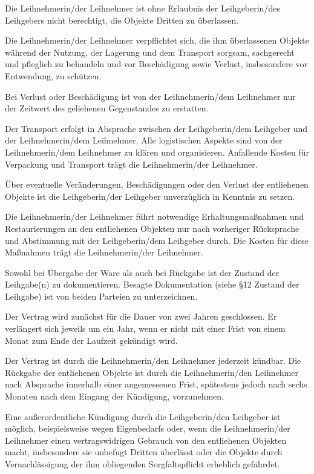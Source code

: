 \documentclass[article, 11pt,a4paper, titlepage, parskip=half, bibliography=totocnumbered]{scrreprt}
\begin{document}
\begin{contract}
		\newpage
			
		
		Die Leihnehmerin/der Leihnehmer ist ohne Erlaubnis der Leihgeberin/des Leihgebers nicht berechtigt, die Objekte Dritten zu überlassen.
		
		Die Leihnehmerin/der Leihnehmer verpflichtet sich, die ihm überlassenen Objekte während der Nutzung, der Lagerung und dem Transport sorgsam, sachgerecht und pfleglich zu behandeln und vor Beschädigung sowie Verlust, insbesondere vor Entwendung, zu schützen.
		
		Bei Verlust oder Beschädigung ist von der Leihnehmerin/dem Leihnehmer nur der Zeitwert des geliehenen Gegenstandes zu erstatten.
		
		Der Transport erfolgt in Absprache zwischen der Leihgeberin/dem Leihgeber und der Leihnehmerin/dem Leihnehmer. Alle logistischen Aspekte sind von der Leihnehmerin/dem Leihnehmer zu klären und organisieren. Anfallende Kosten für Verpackung und Transport trägt die Leihnehmerin/der Leihnehmer.
		
		Über eventuelle Veränderungen, Beschädigungen oder den Verlust der entliehenen Objekte ist die Leihgeberin/der Leihgeber unverzüglich in Kenntnis zu setzen.
		
		Die Leihnehmerin/der Leihnehmer führt notwendige Erhaltungsmaßnahmen und Restaurierungen an den entliehenen Objekten nur nach vorheriger Rücksprache und Abstimmung mit der Leihgeberin/dem Leihgeber durch. Die Kosten für diese Maßnahmen trägt die Leihnehmerin/der Leihnehmer.
		
		Sowohl bei Übergabe der Ware als auch bei Rückgabe ist der Zustand der Leihgabe(n) zu dokumentieren. Besagte Dokumentation (siehe §12 Zustand der Leihgabe) ist von beiden Parteien zu unterzeichnen.
		
		
		
		Der Vertrag wird zunächst für die Dauer von zwei Jahren geschlossen. Er verlängert sich jeweils um ein Jahr, wenn er nicht mit einer Frist von einem Monat zum Ende der Laufzeit gekündigt wird.
		
		Der Vertrag ist durch die Leihnehmerin/den Leihnehmer jederzeit kündbar. Die Rückgabe der entliehenen Objekte ist durch die Leihnehmerin/den Leihnehmer nach Absprache innerhalb einer angemessenen Frist, spätestens jedoch nach sechs Monaten nach dem Eingang der Kündigung, vorzunehmen.
		
		Eine außerordentliche Kündigung durch die Leihgeberin/den Leihgeber ist möglich, beispielsweise wegen Eigenbedarfs oder, wenn die Leihnehmerin/der Leihnehmer einen vertragswidrigen Gebrauch von den entliehenen Objekten macht, insbesondere sie unbefugt Dritten überlässt oder die Objekte durch Vernachlässigung der ihm obliegenden Sorgfaltspflicht erheblich gefährdet.
		


\end{contract}
\end{document}
